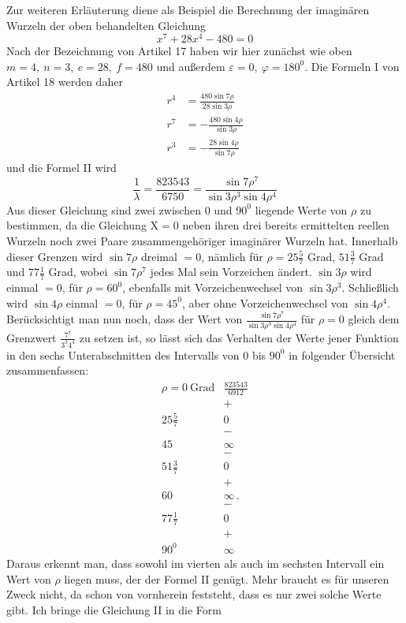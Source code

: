 Zur weiteren Erläuterung diene als Beispiel die Berechnung der imaginären Wurzeln der oben behandelten Gleichung
\[
x^7+28x^4-480=0
\]
Nach der Bezeichnung von Artikel 17 haben wir hier zunächst wie oben $m=4,\ n=3,\ e=28,\ f=480$ und außerdem $\varepsilon=0,\ \varphi=180^{0}$. Die Formeln I von Artikel 18 werden daher
\[
\begin{aligned}
r^4&=\frac{480\sin7\rho}{28\sin3\rho}\\
r^7&=-\frac{480\sin4\rho}{\sin3\rho}\\
r^3&=-\frac{28\sin4\rho}{\sin7\rho}
\end{aligned}
\]
und die Formel II wird
\[
\frac{1}{\lambda}=\frac{823543}{6750}=\frac{\sin7\rho^7}{\sin3\rho^3\sin4\rho^4}
\]
Aus dieser Gleichung sind zwei zwischen $0$ und $90^{0}$ liegende Werte von $\rho$ zu bestimmen, da die Gleichung $\mathrm{X}=0$ neben ihren drei bereits ermittelten reellen Wurzeln noch zwei Paare zusammengehöriger imaginärer Wurzeln hat. Innerhalb dieser Grenzen wird $\sin7\rho$ dreimal $=0$, nämlich für $\rho=25\frac57$ Grad, $51\frac37$ Grad und $77\frac17$ Grad, wobei $\sin7\rho^7$ jedes Mal sein Vorzeichen ändert. $\sin3\rho$ wird einmal $=0$, für $\rho=60^{0}$, ebenfalls mit Vorzeichenwechsel von $\sin3\rho^3$. Schließlich wird $\sin4\rho$ einmal $=0$, für $\rho=45^{0}$, aber ohne Vorzeichenwechsel von $\sin4\rho^4$. Berücksichtigt man nun noch, dass der Wert von $\frac{\sin7\rho^7}{\sin3\rho^3\sin4\rho^4}$ für $\rho=0$ gleich dem Grenzwert $\frac{7^7}{3^3 4^4}$ zu setzen ist, so lässt sich das Verhalten der Werte jener Funktion in den sechs Unterabschnitten des Intervalls von $0$ bis $90^{0}$ in folgender Übersicht zusammenfassen:
\[
\begin{array}{c|c}
\rho=0\ \text{Grad}&\frac{823543}{6912}\\
&+\\
25\frac57&0\\
&-\\
45&\infty\\
&-\\
51\frac37&0\\
&+\\
60&\infty\,.\\
&-\\
77\frac17&0\\
&+\\
90^{0}&\infty
\end{array}
\]
Daraus erkennt man, dass sowohl im vierten als auch im sechsten Intervall ein Wert von $\rho$ liegen muss, der der Formel II genügt. Mehr braucht es für unseren Zweck nicht, da schon von vornherein feststeht, dass es nur zwei solche Werte gibt. Ich bringe die Gleichung II in die Form
